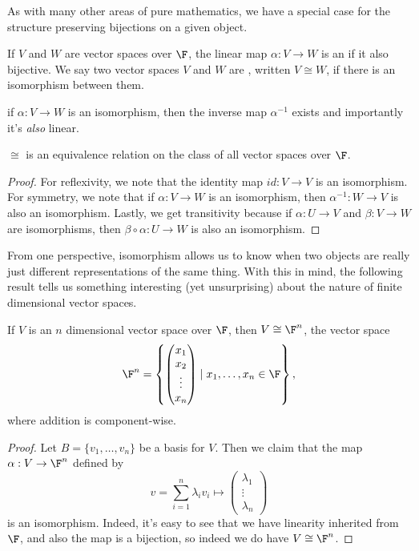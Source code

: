 \documentclass[a4paper]{scrartcl}
\begin{document}
As with many other areas of pure mathematics, we have a special case for the structure preserving bijections on a given object.

\begin{definition}[Isomorphism]
    If $V$ and $W$ are vector spaces over $\F$, the linear map $\alpha: V \rightarrow W$ is an  if it also bijective. We say two vector spaces $V$ and $W$ are , written $V \cong W$, if there is an isomorphism between them.
\end{definition}

\begin{remark}
    if $\alpha:V \rightarrow W$ is an isomorphism, then the inverse map $\alpha^{-1}$ exists and importantly it's \emph{also} linear.
\end{remark}

\begin{lemma}
    $\cong$ is an equivalence relation on the class of all vector spaces over $\F$.
\end{lemma}
\begin{proof}
    For reflexivity, we note that the identity map $id: V \rightarrow V$ is an isomorphism. For symmetry, we note that if $\alpha: V \rightarrow W$ is an isomorphism, then $\alpha^{-1}: W \rightarrow V$ is also an isomorphism. Lastly, we get transitivity because if $\alpha: U \rightarrow V$ and $\beta: V \rightarrow W$ are isomorphisms, then $\beta \circ \alpha: U \rightarrow W$ is also an isomorphism.
\end{proof}

From one perspective, isomorphism allows us to know when two objects are really just different representations of the same thing. With this in mind, the following result tells us something interesting (yet unsurprising) about the nature of finite dimensional vector spaces.


\begin{theorem}
    If $V$ is an $n$ dimensional vector space over $\F$, then $V \cong \F^n$, the vector space
    $$
    \F^n = \left\{\begin{pmatrix}x_1 \\ x_2 \\ \vdots \\ x_n\end{pmatrix} \mid x_1, \dots, x_n \in \F \right\},
    $$
    where addition is component-wise.
\end{theorem}
\begin{proof}
    Let $B = \{v_1, \dots, v_n\}$ be a basis for $V$. Then we claim that the map $\alpha: V \rightarrow \F^n$ defined by 
    $$
    v = \sum_{i = 1}^n \lambda_i v_i \longmapsto \begin{pmatrix}\lambda_1 \\ \vdots \\ \lambda_n\end{pmatrix}
    $$
    is an isomorphism. Indeed, it's easy to see that we have linearity inherited from $\F$, and also the map is a bijection, so indeed we do have $V \cong \F^n$.
\end{proof}
\end{document}

